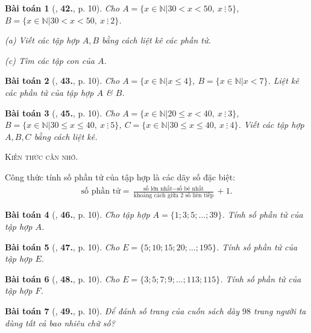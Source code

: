 \documentclass{article}
\numberwithin{equation}{section}
\newtheorem{baitoan}{Bài toán}[section]
\begin{document}
\begin{baitoan}[\cite{Trong_Toan_6_2021}, \textbf{42.}, p. 10]
	Cho $A = \{x\in\mathbb{N}|30 < x < 50,\ x\ \vdots\ 5\}$, $B = \{x\in\mathbb{N}|30 < x < 50,\ x\ \vdots\ 2\}$.
	\begin{enumerate*}
		\item[(a)] Viết các tập hợp $A,B$ bằng cách liệt kê các phần tử.
		\item[(c)] Tìm các tập con của $A$.
	\end{enumerate*}
\end{baitoan}

\begin{baitoan}[\cite{Trong_Toan_6_2021}, \textbf{43.}, p. 10]
	Cho $A = \{x\in\mathbb{N}|x\le 4\}$, $B = \{x\in\mathbb{N}|x < 7\}$. Liệt kê các phần tử của tập hợp $A$ \& $B$.
\end{baitoan}

\begin{baitoan}[\cite{Trong_Toan_6_2021}, \textbf{45.}, p. 10]
	Cho $A = \{x\in\mathbb{N}|20\le x < 40,\ x\ \vdots\ 3\}$, $B = \{x\in\mathbb{N}|30\le x\le 40,\ x\ \vdots\ 5\}$, $C = \{x\in\mathbb{N}|30\le x\le 40,\ x\ \vdots\ 4\}$. Viết các tập hợp $A,B,C$ bằng cách liệt kê.
\end{baitoan}
\noindent\textsc{Kiến thức cần nhớ.}
\begin{tcolorbox}
	Công thức tính số phần tử của tập hợp là các dãy số đặc biệt:
	\begin{align*}
		\mbox{số phần tử} = \frac{\mbox{số lớn nhất} - \mbox{số bé nhất}}{\mbox{khoảng cách giữa 2 số liên tiếp}} + 1.
	\end{align*}
\end{tcolorbox}

\begin{baitoan}[\cite{Trong_Toan_6_2021}, \textbf{46.}, p. 10]
	Cho tập hợp $A = \{1;3;5;\ldots;39\}$. Tính số phần tử của tập hợp $A$.
\end{baitoan}

\begin{baitoan}[\cite{Trong_Toan_6_2021}, \textbf{47.}, p. 10]
	Cho $E = \{5;10;15;20;\ldots;195\}$. Tính số phần tử của tập hợp $E$.
\end{baitoan}

\begin{baitoan}[\cite{Trong_Toan_6_2021}, \textbf{48.}, p. 10]
	Cho $E = \{3;5;7;9;\ldots;113;115\}$. Tính số phần tử của tập hợp $F$.
\end{baitoan}

\begin{baitoan}[\cite{Trong_Toan_6_2021}, \textbf{49.}, p. 10]
	Để đánh số trang của cuốn sách dày $98$ trang người ta dùng tất cả bao nhiêu chữ số?
\end{baitoan}
\end{document}
